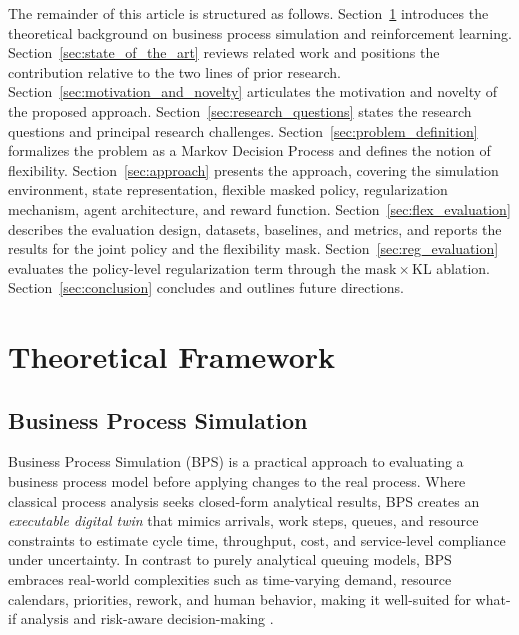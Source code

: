 \documentclass[journal,onecolumn]{IEEEtran}
\begin{document}
The remainder of this article is structured as follows.
Section~\ref{sec:theoretical_framework} introduces the theoretical background
on business process simulation and reinforcement learning.
Section~\ref{sec:state_of_the_art} reviews related work and positions the
contribution relative to the two lines of prior research.
Section~\ref{sec:motivation_and_novelty} articulates the motivation and novelty
of the proposed approach.
Section~\ref{sec:research_questions} states the research questions and principal
research challenges.
Section~\ref{sec:problem_definition} formalizes the problem as a Markov Decision
Process and defines the notion of flexibility.
Section~\ref{sec:approach} presents the approach, covering the simulation
environment, state representation, flexible masked policy, regularization
mechanism, agent architecture, and reward function.
Section~\ref{sec:flex_evaluation} describes the evaluation design, datasets,
baselines, and metrics, and reports the results for the joint policy and the
flexibility mask.
Section~\ref{sec:reg_evaluation} evaluates the policy-level regularization term
through the mask\,$\times$\,KL ablation.
Section~\ref{sec:conclusion} concludes and outlines future
directions.

\section{Theoretical Framework}
\label{sec:theoretical_framework}

\subsection{Business Process Simulation}
\label{subsec:bps}

Business Process Simulation (BPS) is a practical approach to evaluating a
business process model before applying changes to the real process. Where
classical process analysis seeks closed-form analytical results, BPS creates
an \emph{executable digital twin} that mimics arrivals, work steps, queues,
and resource constraints to estimate cycle time, throughput, cost, and
service-level compliance under uncertainty. In contrast to purely analytical
queuing models, BPS embraces real-world complexities such as time-varying
demand, resource calendars, priorities, rework, and human behavior, making
it well-suited for what-if analysis and risk-aware decision-making
\cite{law_kelton_2015, banks_2010, laguna_marklund_2019, declarative}.
\end{document}
